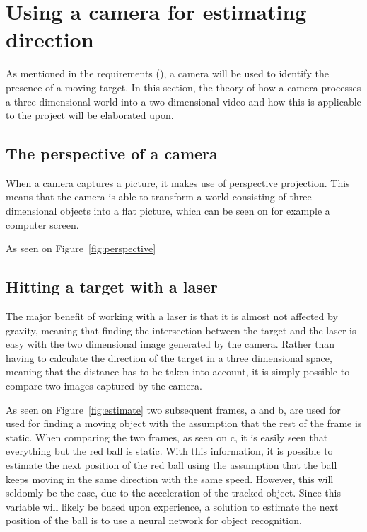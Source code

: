 \section{Using a camera for estimating direction}
As mentioned in the requirements (\label{subsec:requirements}), a camera will be used to identify the presence of a moving target.
In this section, the theory of how a camera processes a three dimensional world into a two dimensional video and how this is applicable to the project will be elaborated upon.

\subsection{The perspective of a camera}
When a camera captures a picture, it makes use of perspective projection.
This means that the camera is able to transform a world consisting of three dimensional objects into a flat picture, which can be seen on for example a computer screen.


As seen on Figure~\ref{fig:perspective} 


\subsection{Hitting a target with a laser}
The major benefit of working with a laser is that it is almost not affected by gravity, meaning that finding the intersection between the target and the laser is easy with the two dimensional image generated by the camera.
Rather than having to calculate the direction of the target in a three dimensional space, meaning that the distance has to be taken into account, it is simply possible to compare two images captured by the camera.

As seen on Figure~\ref{fig:estimate} two subsequent frames, a and b, are used for used for finding a moving object with the assumption that the rest of the frame is static. 
When comparing the two frames, as seen on c, it is easily seen that everything but the red ball is static.
With this information, it is possible to estimate the next position of the red ball using the assumption that the ball keeps moving in the same direction with the same speed.
However, this will seldomly be the case, due to the acceleration of the tracked object.
Since this variable will likely be based upon experience, a solution to estimate the next position of the ball is to use a neural network for object recognition.